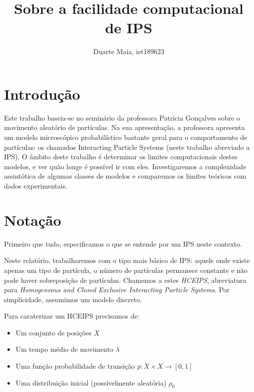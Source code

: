 \documentclass{article}
\title{Sobre a facilidade computacional de IPS}
\author{Duarte Maia, ist189623}
\date{}
\begin{document}
	\maketitle
	
	\tableofcontents

	\section{Introdução}

	Este trabalho baseia-se no seminário da professora Patrícia Gonçalves sobre o movimento aleatório de partículas.
	Na sua apresentação, a professora apresenta um modelo microscópico probabilístico bastante geral para o comportamento de partículas: os chamados Interacting Particle Systems (neste trabalho abreviado a IPS). O âmbito deste trabalho é determinar os limites computacionais destes modelos, e ver quão longe é possível ir com eles. Investigaremos a complexidade assintótica de algumas classes de modelos e comparemos os limites teóricos com dados experimentais.

	\section{Notação}

	Primeiro que tudo, especificamos o que se entende por um IPS neste contexto.
	
	Neste relatório, trabalharemos com o tipo mais básico de IPS: aquele onde existe apenas um tipo de partícula, o número de partículas permanece constante e não pode haver sobreposição de partículas. Chamemos a estes \emph{HCEIPS}, abreviatura para \emph{Homogeneous and Closed Exclusive Interacting Particle Systems}. Por simplicidade, assumimos um modelo discreto.
	
	Para caraterizar um HCEIPS precisamos de:
	
	\begin{itemize}
	\item Um conjunto de posições $X$
	
	\item Um tempo médio de movimento $\lambda$
	
	\item Uma função probabilidade de transição $p : X \times X \rightarrow [0,1]$
	
	\item Uma distribuição inicial (possívelmente aleatória) $\rho_0$
	\end{itemize}
	
\end{document}
